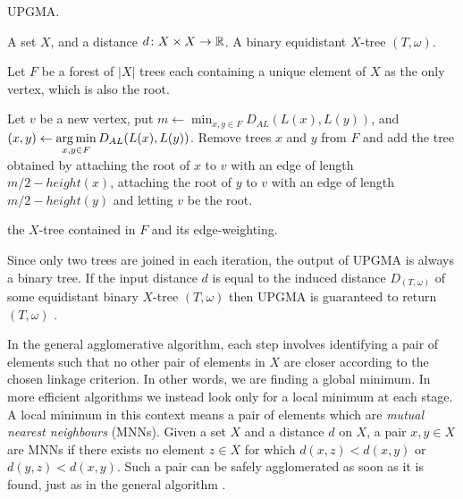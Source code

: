 \begin{algorithm}[h]
  \caption{UPGMA.}
  \label{alg:upgma}

  \begin{algorithmic}
    \Require A set $X$, and a distance $d \colon X \times X \to {\mathbb R}$.
    \Ensure  A binary equidistant $X$-tree $(T, \omega)$.

    \State Let $F$ be a forest of $|X|$ trees each containing a unique element
    of $X$ as the only vertex, which is also the root.


       \State Let $v$ be a new vertex,
       \State put $\displaystyle m \gets \min_{x,y \in F} D_{AL}(L(x),L(y))$,
       \State and $\displaystyle (x,y) \gets \operatorname*{arg\,min}_{x,y \in F} D_{AL}(L(x),L(y))$.
       \State Remove trees $x$ and $y$ from $F$ and add the tree obtained by
         attaching the root of $x$ to $v$ with an edge of length $m/2 -
         height(x)$, attaching the root of $y$ to $v$ with an edge of length
         $m/2 - height(y)$ and letting $v$ be the root.
    
    \EndWhile

    \State \Return the $X$-tree contained in $F$ and its edge-weighting.
  \end{algorithmic}
\end{algorithm}

Since only two trees are joined in each iteration, the output of UPGMA is
always a binary tree.  If the input distance $d$ is equal to the induced
distance $D_{(T,\omega)}$ of some equidistant binary $X$-tree $(T,\omega)$
then UPGMA is guaranteed to return $(T,\omega)$ \cite{durbin1998biological}.



In the general agglomerative algorithm, each step involves identifying a pair
of elements such that no other pair of elements in $X$ are closer according to
the chosen linkage criterion.  In other words, we are finding a global
minimum.  In more efficient algorithms we instead look only for a local
minimum at each stage.  A local minimum in this context means a pair of
elements which are \textit{mutual nearest neighbours} (MNNs).  Given a set $X$
and a distance $d$ on $X$, a pair $x,y \in X$ are MNNs if there exists no
element $z \in X$ for which $d(x,z) < d(x,y)$ or $d(y,z) < d(x,y)$.  Such a
pair can be safely agglomerated as soon as it is found, just as in the general
algorithm \cite{murtagh2011methods}.


